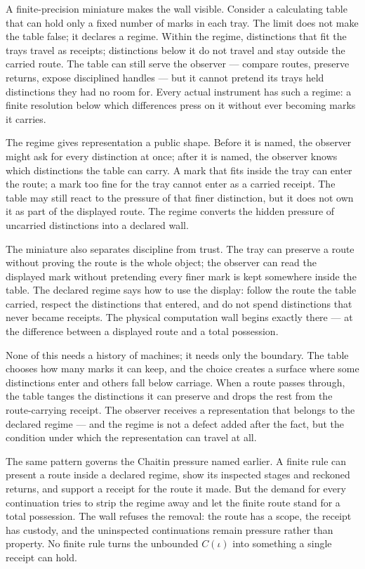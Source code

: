 A finite-precision miniature makes the wall visible. Consider a calculating table that can hold only a fixed number of marks in each tray. The limit does not make the table false; it declares a regime. Within the regime, distinctions that fit the trays travel as receipts; distinctions below it do not travel and stay outside the carried route. The table can still serve the observer --- compare routes, preserve returns, expose disciplined handles --- but it cannot pretend its trays held distinctions they had no room for. Every actual instrument has such a regime: a finite resolution below which differences press on it without ever becoming marks it carries.

The regime gives representation a public shape. Before it is named, the observer might ask for every distinction at once; after it is named, the observer knows which distinctions the table can carry. A mark that fits inside the tray can enter the route; a mark too fine for the tray cannot enter as a carried receipt. The table may still react to the pressure of that finer distinction, but it does not own it as part of the displayed route. The regime converts the hidden pressure of uncarried distinctions into a declared wall.

The miniature also separates discipline from trust. The tray can preserve a route without proving the route is the whole object; the observer can read the displayed mark without pretending every finer mark is kept somewhere inside the table. The declared regime says how to use the display: follow the route the table carried, respect the distinctions that entered, and do not spend distinctions that never became receipts. The physical computation wall begins exactly there --- at the difference between a displayed route and a total possession.

None of this needs a history of machines; it needs only the boundary. The table chooses how many marks it can keep, and the choice creates a surface where some distinctions enter and others fall below carriage. When a route passes through, the table tanges the distinctions it can preserve and drops the rest from the route-carrying receipt. The observer receives a representation that belongs to the declared regime --- and the regime is not a defect added after the fact, but the condition under which the representation can travel at all.

The same pattern governs the Chaitin pressure named earlier. A finite rule can present a route inside a declared regime, show its inspected stages and reckoned returns, and support a receipt for the route it made. But the demand for every continuation tries to strip the regime away and let the finite route stand for a total possession. The wall refuses the removal: the route has a scope, the receipt has custody, and the uninspected continuations remain pressure rather than property. No finite rule turns the unbounded $C(\iota)$ into something a single receipt can hold.

